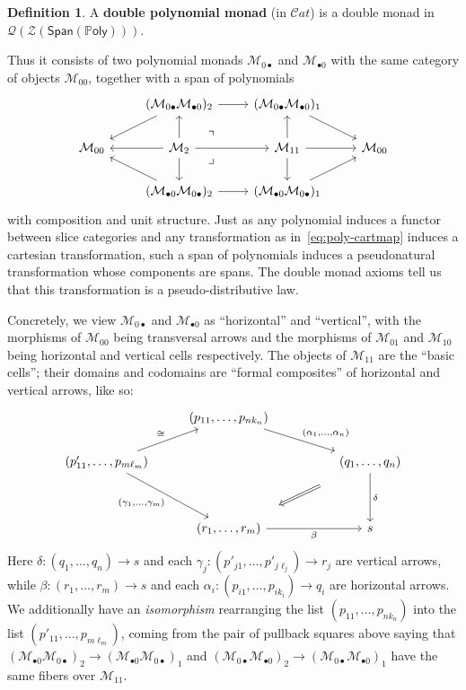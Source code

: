 \documentclass{article}
\theoremstyle{definition}
\newtheorem{defn}[thm]{Definition}
\theoremstyle{remark}
\def\M{\mathcal{M}}
\def\Mh{\M_{\bullet 0}}
\def\Mv{\M_{0\bullet}}
\def\Cat{\mathcal{C}\mathit{at}}
\def\Poly{\mathbb{P}\mathsf{oly}}
\def\Span{\mathsf{Span}}
\def\sZ{\mathcal{Z}}
\def\sQ{\mathcal{Q}}
\def\twocell#1#2#3{\ar[from=#1,to=#2,phantom,""{name=1,near start},""{name=2,near end}]\ar[Rightarrow,from=1,to=2,"#3"]}
\begin{document}
\begin{defn}
  A \textbf{double polynomial monad} (in $\Cat$) is a double monad in $\sQ(\sZ(\Span(\Poly)))$.
\end{defn}

Thus it consists of two polynomial monads $\Mv$ and $\Mh$ with the same category of objects $\M_{00}$, together with a span of polynomials
\[
\begin{tikzcd}
   & (\Mv\Mh)_2 \ar[dl] \ar[r] & (\Mv\Mh)_1 \ar[dr] & \\
  \M_{00} & \M_2 \ar[l] \ar[r] \ar[u] \ar[d] \ar[ur,phantom,near start,"\urcorner"] \ar[dr,phantom,near start,"\lrcorner"] & \M_{11} \ar[r] \ar[u] \ar[d] & \M_{00}\\
   & (\Mh\Mv)_2 \ar[ul] \ar[r] & (\Mh\Mv)_1 \ar[ur] & 
\end{tikzcd}
\]
with composition and unit structure.
Just as any polynomial induces a functor between slice categories and any transformation as in~\eqref{eq:poly-cartmap} induces a cartesian transformation, such a span of polynomials induces a pseudonatural transformation whose components are spans.
The double monad axioms tell us that this transformation is a pseudo-distributive law.

Concretely, we view $\Mv$ and $\Mh$ as ``horizontal'' and ``vertical'', with the morphisms of $\M_{00}$ being transversal arrows and the morphisms of $\M_{01}$ and $\M_{10}$ being horizontal and vertical cells respectively.
The objects of $\M_{11}$ are the ``basic cells''; their domains and codomains are ``formal composites'' of horizontal and vertical arrows, like so:
\begin{equation}\label{eq:dpcell}
\begin{tikzcd}
  & (p_{11},\dots,p_{nk_n}) \ar[drr,"{(\alpha_1,\dots,\alpha_n)}"]  \\
  (p'_{11},\dots,p_{m\ell_m}) \ar[ddr,swap,"{(\gamma_1,\dots,\gamma_m)}"] \ar[ur,"\cong"] & \twocell{rr}{dd}{} && (q_1,\dots,q_n) \ar[dd,"\delta"]\\
  \\
  & (r_1,\dots,r_m) \ar[rr,swap,"\beta"] && s
\end{tikzcd}
\end{equation}
Here $\delta:(q_1,\dots,q_n) \to s$ and each $\gamma_j : (p'_{j1},\dots,p'_{j\ell_j}) \to r_j$ are vertical arrows, while $\beta:(r_1,\dots,r_m)\to s$ and each $\alpha_i : (p_{i1},\dots,p_{ik_i})\to q_i$ are horizontal arrows.
We additionally have an \emph{isomorphism} rearranging the list $(p_{11},\dots,p_{nk_n})$ into the list $(p'_{11},\dots,p_{m\ell_m})$, coming from the pair of pullback squares above saying that $(\Mh\Mv)_2\to (\Mh\Mv)_1$ and $(\Mv\Mh)_2\to (\Mv\Mh)_1$ have the same fibers over $\M_{11}$.
\end{document}
